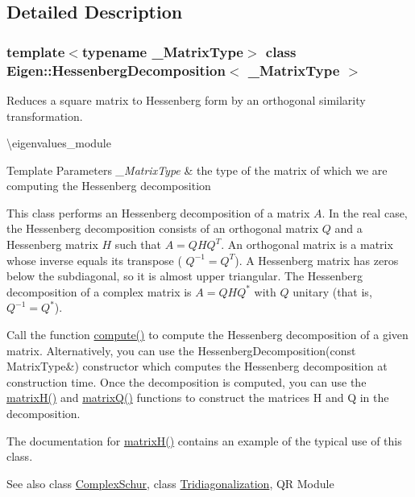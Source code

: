 \subsection{Detailed Description}
\subsubsection*{template$<$typename \+\_\+\+Matrix\+Type$>$\newline
class Eigen\+::\+Hessenberg\+Decomposition$<$ \+\_\+\+Matrix\+Type $>$}

Reduces a square matrix to Hessenberg form by an orthogonal similarity transformation. 

\textbackslash{}eigenvalues\+\_\+module


\begin{DoxyTemplParams}{Template Parameters}
{\em \+\_\+\+Matrix\+Type} & the type of the matrix of which we are computing the Hessenberg decomposition\\
\hline
\end{DoxyTemplParams}
This class performs an Hessenberg decomposition of a matrix $ A $. In the real case, the Hessenberg decomposition consists of an orthogonal matrix $ Q $ and a Hessenberg matrix $ H $ such that $ A = Q H Q^T $. An orthogonal matrix is a matrix whose inverse equals its transpose ( $ Q^{-1} = Q^T $). A Hessenberg matrix has zeros below the subdiagonal, so it is almost upper triangular. The Hessenberg decomposition of a complex matrix is $ A = Q H Q^* $ with $ Q $ unitary (that is, $ Q^{-1} = Q^* $).

Call the function \mbox{\hyperlink{class_eigen_1_1_hessenberg_decomposition_a239a6fd42c57aab3c0b048c47fde3004}{compute()}} to compute the Hessenberg decomposition of a given matrix. Alternatively, you can use the Hessenberg\+Decomposition(const Matrix\+Type\&) constructor which computes the Hessenberg decomposition at construction time. Once the decomposition is computed, you can use the \mbox{\hyperlink{class_eigen_1_1_hessenberg_decomposition_a8e781d2e22a2304647bcf0ae913cc8ea}{matrix\+H()}} and \mbox{\hyperlink{class_eigen_1_1_hessenberg_decomposition_a346441e4902a58d43d698ac3da6ff791}{matrix\+Q()}} functions to construct the matrices H and Q in the decomposition.

The documentation for \mbox{\hyperlink{class_eigen_1_1_hessenberg_decomposition_a8e781d2e22a2304647bcf0ae913cc8ea}{matrix\+H()}} contains an example of the typical use of this class.

\begin{DoxySeeAlso}{See also}
class \mbox{\hyperlink{class_eigen_1_1_complex_schur}{Complex\+Schur}}, class \mbox{\hyperlink{class_eigen_1_1_tridiagonalization}{Tridiagonalization}}, QR Module 
\end{DoxySeeAlso}


